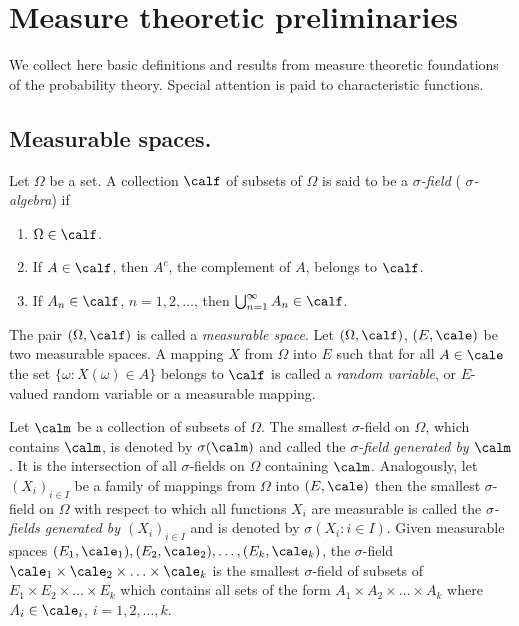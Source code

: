 \documentclass[preprint]{imsart}
\begin{document}
{\chapter{Measure theoretic preliminaries}
We collect here  basic definitions and results from measure theoretic foundations of the probability
theory. Special attention is paid to characteristic functions.

\section{Measurable spaces.}

Let $\Omega$ be a set. A collection $\calf$ of subsets
of $\Omega$ is said to be a {\em $\sigma$-field} ({\em
$\sigma$-algebra}) if
\begin{enumerate}
  \item[1)] $\Omega\in\calf$.

  \item[2)] If $A\in\calf$, then $A^c$, the complement
   of $A$, belongs to $\calf$.

  \item[3)] If $A_n\in\calf$, $n=1,2,\ldots$, then
  $\bigcup_{n=1}^\infty A_n\in\calf$.
\end{enumerate}
The pair $(\Omega ,\calf )$ is called a {\em measurable
space}. Let $(\Omega ,\calf )$, $(E ,\cale )$ be two
measurable spaces. A mapping $X$ from $\Omega$ into $E$
such that for all $A\in \cale$ the set $\{\omega :
X(\omega)\in A\}$ belongs to $\calf$ is called a {\em
random variable}, or $E$-valued random variable or a
measurable mapping.

Let $\calm$ be a collection of subsets of $\Omega$. The
smallest $\sigma$-field on $\Omega$, which contains
$\calm$, is denoted by $\sigma (\calm)$ and called the
{\em $\sigma$-field generated by $\calm$}. It is the
intersection of all $\sigma$-fields on $\Omega$
containing $\calm$. Analogously, let $(X_i)_{i\in I}$
be a family of mappings from $\Omega$ into $(E,\cale)$
then the smallest $\sigma$-field on $\Omega$ with
respect to which all functions $X_i$ are measurable is
called the {\em $\sigma$-fields generated by
$(X_i)_{i\in I}$} and is denoted by $\sigma (X_i:i\in
I)$. Given measurable spaces
 $(E_1,\cale_1), (E_2,\cale_2),\ldots ,(E_k,\cale_k)$,
the $\sigma$-field
$\cale_1\times\cale_2\times\ldots\times
\cale_k$ is the smallest $\sigma$-field of subsets of
 $E_1\times
E_2\times\ldots\times E_k$ which contains all sets of
the form  $A_1\times A_2\times\ldots\times A_k$ where
$A_i\in \cale_i$, $i=1,2,\ldots,k$.

}
\end{document}

